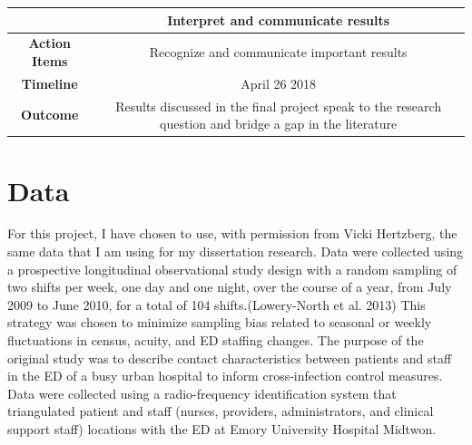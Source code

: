 \documentclass[]{elsarticle} %
\begin{document}
\begin{longtable}[]{@{}cc@{}}
\toprule
\begin{minipage}[b]{0.25\columnwidth}\centering\strut
~\strut
\end{minipage} & \begin{minipage}[b]{0.42\columnwidth}\centering\strut
Interpret and communicate results\strut
\end{minipage}\tabularnewline
\midrule
\endhead
\begin{minipage}[t]{0.25\columnwidth}\centering\strut
\textbf{Action Items}\strut
\end{minipage} & \begin{minipage}[t]{0.42\columnwidth}\centering\strut
Recognize and communicate important results\strut
\end{minipage}\tabularnewline
\begin{minipage}[t]{0.25\columnwidth}\centering\strut
\textbf{Timeline}\strut
\end{minipage} & \begin{minipage}[t]{0.42\columnwidth}\centering\strut
April 26 2018\strut
\end{minipage}\tabularnewline
\begin{minipage}[t]{0.25\columnwidth}\centering\strut
\textbf{Outcome}\strut
\end{minipage} & \begin{minipage}[t]{0.42\columnwidth}\centering\strut
Results discussed in the final project speak to the research question
and bridge a gap in the literature\strut
\end{minipage}\tabularnewline
\bottomrule
\end{longtable}

\section{Data}\label{data}

For this project, I have chosen to use, with permission from Vicki
Hertzberg, the same data that I am using for my dissertation research.
Data were collected using a prospective longitudinal observational study
design with a random sampling of two shifts per week, one day and one
night, over the course of a year, from July 2009 to June 2010, for a
total of 104 shifts.(Lowery-North et al. 2013) This strategy was chosen
to minimize sampling bias related to seasonal or weekly fluctuations in
census, acuity, and ED staffing changes. The purpose of the original
study was to describe contact characteristics between patients and staff
in the ED of a busy urban hospital to inform cross-infection control
measures. Data were collected using a radio-frequency identification
system that triangulated patient and staff (nurses, providers,
administrators, and clinical support staff) locations with the ED at
Emory University Hospital Midtwon.
\end{document}
